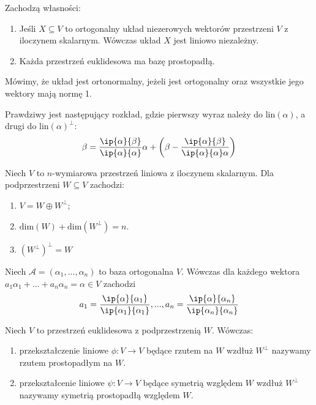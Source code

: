 \documentclass[11pt, a4paper]{article}
\begin{document}
\begin{remark}
    Zachodzą własności:
    \begin{enumerate}
        \item Jeśli \(X \subseteq V\) to ortogonalny układ niezerowych wektorów
        przestrzeni \(V\) z iloczynem skalarnym. Wówczas układ \(X\) jest
        liniowo niezależny.

        \item Każda przestrzeń euklidesowa ma bazę prostopadłą.
    \end{enumerate}
\end{remark}

\begin{definition}
	Mówimy, że układ jest ortonormalny, jeżeli jest ortogonalny
	oraz wszystkie jego wektory mają normę 1.
\end{definition}

\begin{remark}
    Prawdziwy jest następujący rozkład, gdzie pierwszy wyraz należy do
    \(\text{lin}(\alpha)\), a drugi do \(\text{lin}(\alpha)^{\perp}\):
    \[
    \beta = \frac{\ip{\alpha}{\beta}}{\ip{\alpha}{\alpha}}\alpha + \left( \beta
    - \frac{\ip{\alpha}{\beta}}{\ip{\alpha}{\alpha} \alpha} \right)
    \]
\end{remark}

\begin{remark}
    Niech \(V\) to \(n\)-wymiarowa przestrzeń liniowa z iloczynem skalarnym. Dla podprzestrzeni \(W \subseteq V\) zachodzi:
    \begin{enumerate}
        \item \(V = W \oplus W^{\perp}\);
        \item \(\text{dim}(W) + \text{dim}(W^{\perp}) = n\).
        \item \((W^{\perp})^{\perp} = W\)
    \end{enumerate}
\end{remark}

\begin{remark}
    Niech \(\mathcal{A} = (\alpha_1, ..., \alpha_n)\) to baza ortogonalna \(V\).
    Wówczas dla każdego wektora \(a_1 \alpha_1 + ... + a_n \alpha_n = \alpha \in
    V\) zachodzi
    \[
    a_1 = \frac{\ip{\alpha}{\alpha_1}}{\ip{\alpha_1}{\alpha_1}}, ..., a_n =
    \frac{\ip{\alpha}{\alpha_n}}{\ip{\alpha_n}{\alpha_n}}
    \]
\end{remark}


\begin{definition}
	Niech \(V\) to przestrzeń euklidesowa z podprzestrzenią \(W\). Wówczas:
	\begin{enumerate}
	    \item przekształczenie liniowe \(\phi: V \to V\) będące rzutem na \(W\)
			wzdłuż \(W^{\perp}\) nazywamy rzutem prostopadłym na \(W\).
		\item przekształcenie liniowe \(\psi: V \to V\) będące symetrią względem
		\(W\) wzdłuż \(W^{\perp}\) nazywamy symetrią prostopadłą względem \(W\).
    \end{enumerate}
\end{definition}
\end{document}

